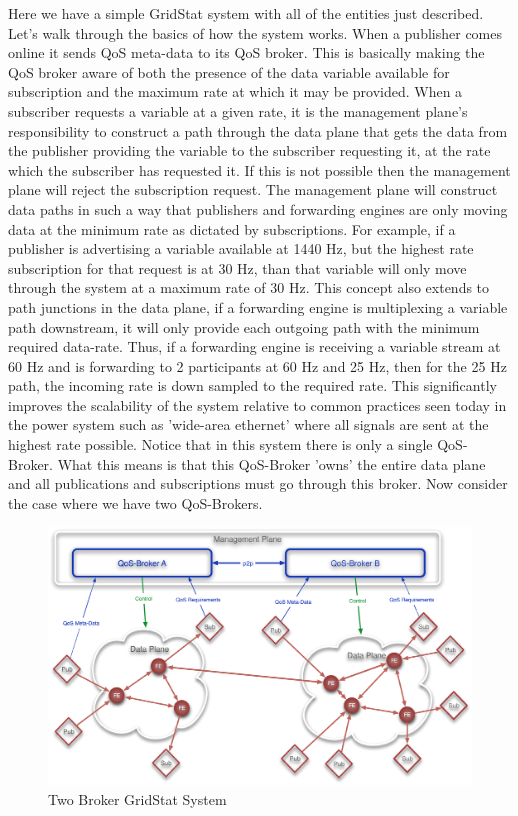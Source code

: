 \documentclass{article}
\begin{document}
Here we have a simple GridStat system with all of the entities just described.  
Let's walk through the basics of how the system works.  When a publisher comes online
 it sends QoS meta-data to its QoS broker.  This is basically making the QoS broker
 aware of both the presence of the data variable available for subscription and the 
maximum rate at which it may be provided.  When a subscriber requests a variable at a 
given rate, it is the management plane's responsibility to construct a path through the 
data plane that gets the data from the publisher providing the variable to the
 subscriber requesting it, at the rate which the subscriber has requested it. 
 If this is not possible then the management plane will reject the subscription
 request.  The management plane will construct data paths in such a way that publishers
 and forwarding engines are only moving data at the minimum rate as dictated by 
subscriptions. For example, if a publisher is advertising a variable available at 
1440 Hz, but the highest rate subscription for that request is at 30 Hz, than that
variable will only move through the system at a maximum rate of 30 Hz.  
This concept also extends to path junctions in the data plane, if a forwarding 
engine is multiplexing a variable path downstream, it will only provide each outgoing 
path with the minimum required data-rate.  Thus, if a forwarding engine is receiving
 a variable stream at 60 Hz and is forwarding to 2 participants at 60 Hz and 25 Hz, 
then for the 25 Hz path, the incoming rate is down sampled to the required rate. This 
significantly improves the scalability of the system relative to common practices seen 
today in the power system such as 'wide-area ethernet' where all signals are sent at 
the highest rate possible. Notice that in this system there is only a single QoS-Broker.
  What this means is that this QoS-Broker 'owns' the entire data plane and all 
publications and subscriptions must go through this broker.  Now consider the case 
where we have two QoS-Brokers.


\begin{figure}[h]
\begin{center}
\includegraphics[scale=0.51]{GridStat2Broker.eps}
\end{center}
\caption{Two Broker GridStat System}
\end{figure}
\end{document}
